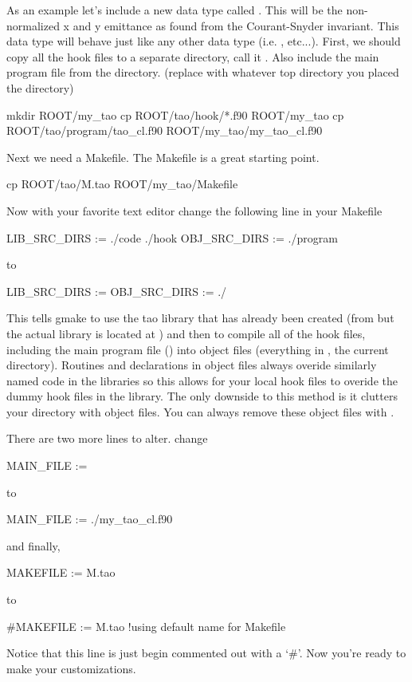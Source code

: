 As an example let's include a new data type called . This
will be the non-normalized x and y emittance as found from the Courant-Snyder
invariant. This data type will behave just like any other data type (i.e.
,  etc...). First, we should copy all the hook files to a
separate directory, call it . Also include the main program file
from the  directory.  (replace  with whatever top
directory you placed the  directory)
\begin{example}
  mkdir ROOT/my_tao
  cp ROOT/tao/hook/*.f90 ROOT/my_tao
  cp ROOT/tao/program/tao_cl.f90 ROOT/my_tao/my_tao_cl.f90
\end{example}
Next we need a Makefile. The  
Makefile is a great starting point.
\begin{example}
  cp ROOT/tao/M.tao ROOT/my_tao/Makefile
\end{example}
Now with your favorite text editor change the following line in your Makefile
\begin{example}
  LIB\_SRC\_DIRS := ./code ./hook
  OBJ\_SRC\_DIRS := ./program
\end{example}
to
\begin{example}
  LIB\_SRC\_DIRS :=
  OBJ\_SRC\_DIRS := ./
\end{example}
This tells gmake to use the tao library that has already been created (from 
 but the actual library is located at )
 and then to compile
all of the hook files, including the main program file ()
into object files (everything in , the current directory).  Routines and
declarations in object files always overide similarly named code in the \tao
libraries so this allows for your local hook files to overide the dummy hook
files in the \tao library. The only downside to this method is it clutters your
 directory with object files. You can always remove these object files
with .

There are two more lines to alter. change
\begin{example}
  MAIN\_FILE :=
\end{example}
to
\begin{example}
  MAIN\_FILE := ./my\_tao_cl.f90
\end{example}
and finally,
\begin{example}
  MAKEFILE := M.tao
\end{example}
to
\begin{example}
  #MAKEFILE := M.tao !using default name for Makefile
\end{example}
Notice that this line is just begin commented out with a `\#'. Now you're ready
to make your customizations.

